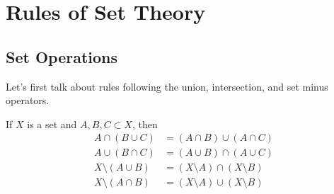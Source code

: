 \section{Rules of Set Theory} 

\subsection{Set Operations}

  Let's first talk about rules following the union, intersection, and set minus operators. 

  \begin{theorem}
    If $X$ is a set and $A,B,C \subset X$, then 
    \begin{align}
      A \cap (B \cup C) & = (A \cap B) \cup (A \cap C) \\
      A \cup (B \cap C) & = (A \cup B) \cap (A \cup C) \\ 
      X \setminus (A \cup B) & = (X \setminus A) \cap (X \setminus B) \\
      X \setminus (A \cap B) & = (X \setminus A) \cup (X \setminus B)
    \end{align}
  \end{theorem}
